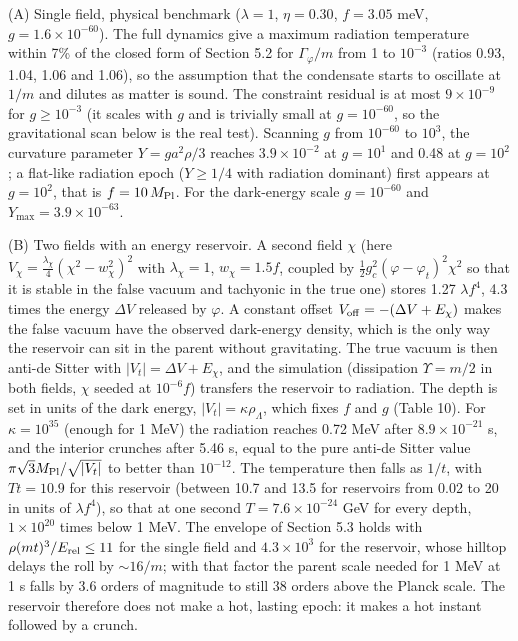 \documentclass[11pt,a4paper]{article}
\begin{document}
(A) Single field, physical benchmark ($\lambda=1$, $\eta=0.30$, $f=3.05$ meV, $g=1.6\times10^{-60}$). The full dynamics give a maximum radiation temperature within 7\% of the closed form of Section 5.2 for $\Gamma_\varphi/m$ from 1 to $10^{-3}$ (ratios 0.93, 1.04, 1.06 and 1.06), so the assumption that the condensate starts to oscillate at $1/m$ and dilutes as matter is sound. The constraint residual is at most $9\times10^{-9}$ for $g\ge10^{-3}$ (it scales with $g$ and is trivially small at $g=10^{-60}$, so the gravitational scan below is the real test). Scanning $g$ from $10^{-60}$ to $10^{3}$, the curvature parameter $Y=ga^2\rho/3$ reaches $3.9\times10^{-2}$ at $g=10^{1}$ and 0.48 at $g=10^{2}$; a flat-like radiation epoch ($Y\ge1/4$ with radiation dominant) first appears at $g=10^{2}$, that is $f=10\,M_{\rm Pl}$. For the dark-energy scale $g=10^{-60}$ and $Y_{\max}=3.9\times10^{-63}$.

(B) Two fields with an energy reservoir. A second field $\chi$ (here $V_\chi=\tfrac{\lambda_\chi}{4}(\chi^2-w_\chi^2)^2$ with $\lambda_\chi=1$, $w_\chi=1.5f$, coupled by $\tfrac12 g_c^2(\varphi-\varphi_t)^2\chi^2$ so that it is stable in the false vacuum and tachyonic in the true one) stores 1.27 $\lambda f^4$, 4.3 times the energy $\Delta V$ released by $\varphi$. A constant offset $V_{\rm off}=-(\Delta V+E_\chi)$ makes the false vacuum have the observed dark-energy density, which is the only way the reservoir can sit in the parent without gravitating. The true vacuum is then anti-de Sitter with $|V_t|=\Delta V+E_\chi$, and the simulation (dissipation $\Upsilon=m/2$ in both fields, $\chi$ seeded at $10^{-6}f$) transfers the reservoir to radiation. The depth is set in units of the dark energy, $|V_t|=\kappa\rho_\Lambda$, which fixes $f$ and $g$ (Table 10). For $\kappa=10^{35}$ (enough for 1 MeV) the radiation reaches 0.72 MeV after $8.9\times10^{-21}$ s, and the interior crunches after 5.46 s, equal to the pure anti-de Sitter value $\pi\sqrt3M_{\rm Pl}/\sqrt{|V_t|}$ to better than $10^{-12}$. The temperature then falls as $1/t$, with $Tt=10.9$ for this reservoir (between 10.7 and 13.5 for reservoirs from 0.02 to 20 in units of $\lambda f^4$), so that at one second $T=7.6\times10^{-24}$ GeV for every depth, $1\times10^{20}$ times below 1 MeV. The envelope of Section 5.3 holds with $\rho(mt)^3/E_{\rm rel}\le11$ for the single field and $4.3\times10^{3}$ for the reservoir, whose hilltop delays the roll by $\sim16/m$; with that factor the parent scale needed for 1 MeV at 1 s falls by $3.6$ orders of magnitude to still 38 orders above the Planck scale. The reservoir therefore does not make a hot, lasting epoch: it makes a hot instant followed by a crunch.
\end{document}
